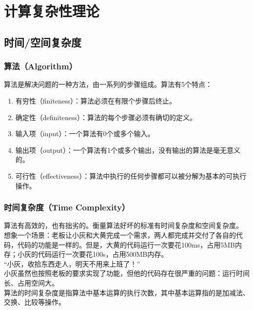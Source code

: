 \chapter{计算复杂性理论}

\section{时间/空间复杂度}

\subsection{算法（Algorithm）}

算法是解决问题的一种方法，由一系列的步骤组成。算法有5个特点：

\begin{enumerate}
	\item 有穷性（finiteness）：算法必须在有限个步骤后终止。
	\item 确定性（definiteness）：算法的每个步骤必须有确切的定义。
	\item 输入项（input）：一个算法有0个或多个输入。
	\item 输出项（output）：一个算法有1个或多个输出，没有输出的算法是毫无意义的。
	\item 可行性（effectiveness）：算法中执行的任何步骤都可以被分解为基本的可执行操作。
\end{enumerate}

\vspace{0.5cm}

\subsection{时间复杂度（Time Complexity）}

算法有高效的，也有拙劣的。衡量算法好坏的标准有时间复杂度和空间复杂度。\\

想象一个场景：老板让小灰和大黄完成一个需求，两人都完成并交付了各自的代码，代码的功能是一样的。但是，大黄的代码运行一次要花100ms，占用5MB内存；小灰的代码运行一次要花100s，占用500MB内存。\\

“小灰，收拾东西走人，明天不用来上班了！”\\

小灰虽然也按照老板的要求实现了功能，但他的代码存在很严重的问题：运行时间长、占用空间大。\\

算法的时间复杂度是指算法中基本运算的执行次数，其中基本运算指的是加减法、交换、比较等操作。\\

